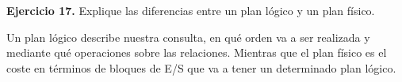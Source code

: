 \documentclass[12pt]{report}
\begin{document}
\textbf{Ejercicio 17.} Explique las diferencias entre un plan lógico y un plan físico.

Un plan lógico describe nuestra consulta, en qué orden va a ser realizada y mediante qué operaciones sobre las relaciones. Mientras que el plan físico es el coste en términos de bloques de E/S que va a tener un determinado plan lógico.
\end{document}
